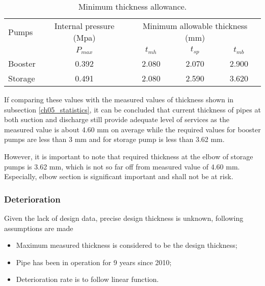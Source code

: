 \begin{table}[h]
	\caption{Minimum thickness allowance.}
	\label{ch05_tbl_thicknesscalcresult}
	{\footnotesize
		\begin{tabular}{l|l|p{3cm}|p{3cm}|p{3cm}}
			\hline
			Pumps & \multicolumn{1}{c|}{Internal pressure  (Mpa)} & \multicolumn{3}{c}{Minimum allowable thickness (mm)} \\ 
			\cline{3-5}
			& \multicolumn{1}{c|}{$P_{max}$} & \multicolumn{1}{c|}{$t_{mh}$} & \multicolumn{1}{c|}{$t_{sp}$} & \multicolumn{1}{c}{$t_{mb}$} \\ 
			\hline
			Booster & \multicolumn{1}{c|}{0.392} & \multicolumn{1}{c|}{2.080} & \multicolumn{1}{c|}{2.070} & \multicolumn{1}{c}{2.900} \\ 
			Storage & \multicolumn{1}{c|}{0.491} & \multicolumn{1}{c|}{2.080} & \multicolumn{1}{c|}{2.590} & \multicolumn{1}{c}{3.620} \\ 
			\hline
		\end{tabular}
		
	}
\end{table}

If comparing these values with the measured values of thickness shown in subsection \ref{ch05_statistics}, it can be concluded that current thickness of pipes at both suction and discharge still provide adequate level of services as the measured value is about 4.60 mm on average while the required values for booster pumps are less than 3 mm and for storage pump is less than 3.62 mm. 

However, it is important to note that required thickness at the elbow of storage pumps is 3.62 mm, which is not so far off from measured value of 4.60 mm. Especially, elbow section is significant important and shall not be at risk.

\subsubsection{Deterioration}
Given the lack of design data, precise design thickness is unknown, following assumptions are made

\begin{itemize}
\item Maximum measured thickness is considered to be the design thickness;
\item Pipe has been in operation for 9 years since 2010;
\item Deterioration rate is to follow linear function.
\end{itemize}

